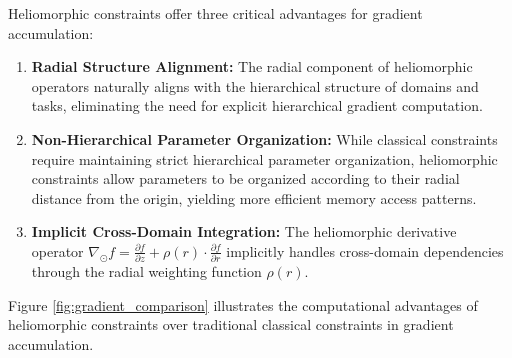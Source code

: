 Heliomorphic constraints offer three critical advantages for gradient accumulation:

\begin{enumerate}
    \item \textbf{Radial Structure Alignment:} The radial component of heliomorphic operators naturally aligns with the hierarchical structure of domains and tasks, eliminating the need for explicit hierarchical gradient computation.
    
    \item \textbf{Non-Hierarchical Parameter Organization:} While classical constraints require maintaining strict hierarchical parameter organization, heliomorphic constraints allow parameters to be organized according to their radial distance from the origin, yielding more efficient memory access patterns.
    
    \item \textbf{Implicit Cross-Domain Integration:} The heliomorphic derivative operator $\nabla_{\odot} f = \frac{\partial f}{\partial z} + \rho(r) \cdot \frac{\partial f}{\partial r}$ implicitly handles cross-domain dependencies through the radial weighting function $\rho(r)$.
\end{enumerate}

Figure \ref{fig:gradient_comparison} illustrates the computational advantages of heliomorphic constraints over traditional classical constraints in gradient accumulation.

